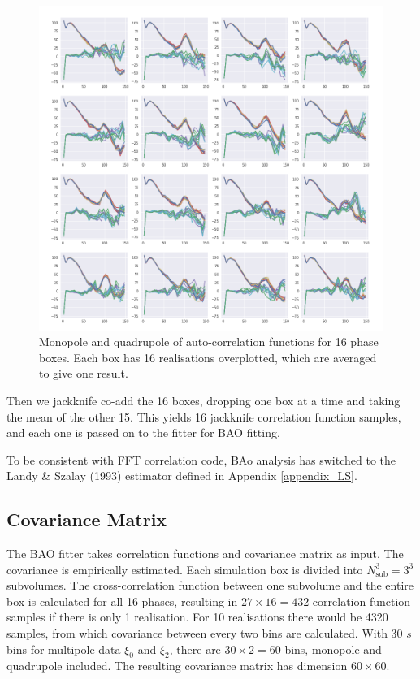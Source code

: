 \documentclass[10pt,A4]{aastex62}
\begin{document}
		\begin{figure}
			\includegraphics[width=\linewidth]{xi_r10_phases_tinker13.png}
		    \caption{Monopole and quadrupole of auto-correlation functions for 16 phase boxes. Each box has 16 realisations overplotted, which are averaged to give one result.}
		    \label{fig:xi_r10_phases}
		\end{figure}
		
		Then we jackknife co-add the 16 boxes, dropping one box at a time and taking the mean of the other 15. This yields 16 jackknife correlation function samples, and each one is passed on to the fitter for BAO fitting.
		
		To be consistent with FFT correlation code, BAo analysis has switched to the Landy \& Szalay (1993) estimator defined in Appendix \ref{appendix_LS}.

	\subsection{Covariance Matrix}
		
		The BAO fitter takes correlation functions and covariance matrix as input. The covariance is empirically estimated. Each simulation box is divided into $N_\text{sub}^3=3^3$ subvolumes. The cross-correlation function between one subvolume and the entire box is calculated for all 16 phases, resulting in $27 \times 16 = 432$ correlation function samples if there is only 1 realisation. For 10 realisations there would be 4320 samples, from which covariance between every two bins are calculated. With 30 $s$ bins for multipole data $\xi_0$ and $\xi_2$, there are $30\times 2 = 60$ bins, monopole and quadrupole included. The resulting covariance matrix has dimension $60\times 60$.
		
\end{document}
